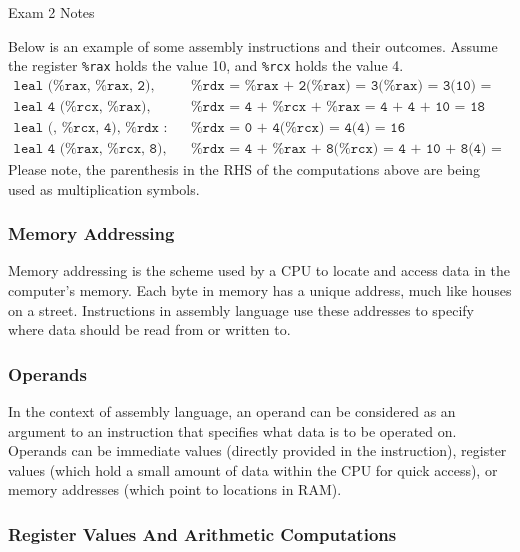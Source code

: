 \begin{examnotes}{Exam 2 Notes}
    \begin{highlight}
        Below is an example of some assembly instructions and their outcomes. Assume the register \texttt{\%rax} holds the value 10, and \texttt{\%rcx} holds the value 4.
        \begin{align*}
            \texttt{leal (\%rax, \%rax, 2), \%rdx : } & \texttt{\%rdx = \%rax + 2(\%rax) = 3(\%rax) = 3(10) = 30} \\
            \texttt{leal 4 (\%rcx, \%rax), \%rdx : } & \texttt{\%rdx = 4 + \%rcx + \%rax = 4 + 4 + 10 = 18} \\
            \texttt{leal (, \%rcx, 4), \%rdx : } & \texttt{\%rdx = 0 + 4(\%rcx) = 4(4) = 16} \\
            \texttt{leal 4 (\%rax, \%rcx, 8), \%rdx : } & \texttt{\%rdx = 4 + \%rax + 8(\%rcx) = 4 + 10 + 8(4) = 14 + 32 = 46}
        \end{align*}
        Please note, the parenthesis in the RHS of the computations above are being used as multiplication symbols.
    \end{highlight}

    \subsubsection*{Memory Addressing}

    Memory addressing is the scheme used by a CPU to locate and access data in the computer's memory. Each byte in memory has a unique address, much like houses on a street. Instructions in assembly 
    language use these addresses to specify where data should be read from or written to.

    \subsubsection*{Operands}

    In the context of assembly language, an operand can be considered as an argument to an instruction that specifies what data is to be operated on. Operands can be immediate values (directly provided 
    in the instruction), register values (which hold a small amount of data within the CPU for quick access), or memory addresses (which point to locations in RAM).

    \subsubsection*{Register Values And Arithmetic Computations}


\end{examnotes}
